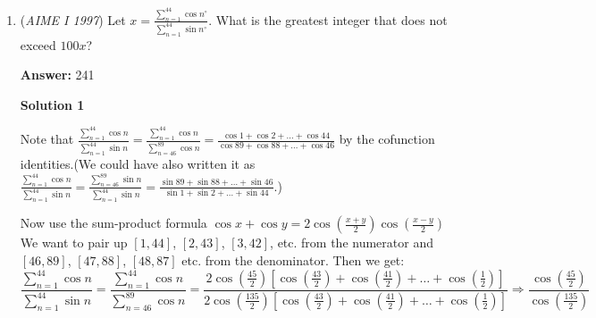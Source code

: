 \begin{enumerate}
 



\textbf{Solution 3}

Treat the sets as ordered. Then for each of the three criterion, there are $3!=6$ choices if the attribute is different and there are $3$ choices is the attribute is the same. Thus all three attributes combine to a total of $(6+3)^3=729$ possibilities. However if all three attributes are the same then the set must be composed of three cards that are the same, which is impossible. This takes out $3^3=27$ possibilities. Notice that we have counted every set $3!=6$ times by treating the set as ordered. The final solution is then $\frac{729-27}{6}=\boxed{117}$




\textbf{Solution 4 (rewording of Solution 3)}

Note that for a possible valid triplet, two cards uniquely determine the third. $27$ choices for each card, so we have $27^2 = 729$ without any conditions. However, we have overcounted. The invalid triplets arise when all three cards are identical to each other, which can only happen in $3^3$ ways ($3$ ways to choose each of the attributes), so we have $729-27=702.$ However, we have overcounted by treating these as ordered, so we divide by $6,$ yielding $\frac{702}{6}=\boxed{117}.$$\newline$~martianrunner

 


	\item (\textit{AIME I 1997}) Let $x=\frac{\sum\limits_{n=1}^{44} \cos n^\circ}{\sum\limits_{n=1}^{44} \sin n^\circ}$. What is the greatest integer that does not exceed $100x$?


 
 \textbf{Answer: }241



\textbf{Solution 1}

Note that $\frac{\sum_{n=1}^{44} \cos n}{\sum_{n=1}^{44} \sin n} = \frac{\sum_{n=1}^{44} \cos n}{\sum_{n=46}^{89} \cos n} = \frac {\cos 1 + \cos 2 + \dots + \cos 44}{\cos 89 + \cos 88 + \dots + \cos 46}$ by the cofunction identities.(We could have also written it as $\frac{\sum_{n=1}^{44} \cos n}{\sum_{n=1}^{44} \sin n} = \frac{\sum_{n=46}^{89} \sin n}{\sum_{n=1}^{44} \sin n} = \frac {\sin 89 + \sin 88 + \dots + \sin 46}{\sin 1 + \sin 2 + \dots + \sin 44}$.)

 Now use the sum-product formula $\cos x + \cos y = 2\cos\left(\frac{x+y}{2}\right)\cos\left(\frac{x-y}{2}\right)$ We want to pair up $[1, 44]$, $[2, 43]$, $[3, 42]$, etc. from the numerator and $[46, 89]$, $[47, 88]$, $[48, 87]$ etc. from the denominator. Then we get:
 \[\frac{\sum_{n=1}^{44} \cos n}{\sum_{n=1}^{44} \sin n} = \frac{\sum_{n=1}^{44} \cos n}{\sum_{n=46}^{89} \cos n} = \frac{2\cos(\frac{45}{2})[\cos(\frac{43}{2})+\cos(\frac{41}{2})+\dots+\cos(\frac{1}{2})]}{2\cos(\frac{135}{2})[\cos(\frac{43}{2})+\cos(\frac{41}{2})+\dots+\cos(\frac{1}{2})]} \Rightarrow \frac{\cos(\frac{45}{2})}{\cos(\frac{135}{2})}\]


\end{enumerate}
